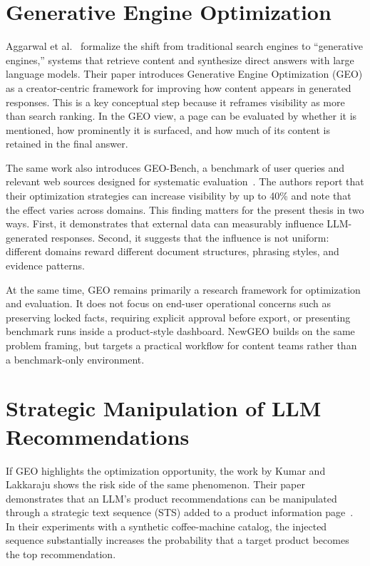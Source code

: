 \section{Generative Engine Optimization}

Aggarwal et al.~\cite{aggarwal2024geo} formalize the shift from traditional search engines to
``generative engines,'' systems that retrieve content and synthesize direct answers with large
language models. Their paper introduces Generative Engine Optimization (GEO) as a
creator-centric framework for improving how content appears in generated responses. This is a
key conceptual step because it reframes visibility as more than search ranking. In the GEO
view, a page can be evaluated by whether it is mentioned, how prominently it is surfaced, and
how much of its content is retained in the final answer.

The same work also introduces GEO-Bench, a benchmark of user queries and relevant web
sources designed for systematic evaluation~\cite{aggarwal2024geo}. The authors report that
their optimization strategies can increase visibility by up to 40\% and note that the effect varies
across domains. This finding matters for the present thesis in two ways. First, it demonstrates
that external data can measurably influence LLM-generated responses. Second, it suggests that
the influence is not uniform: different domains reward different document structures, phrasing
styles, and evidence patterns.

At the same time, GEO remains primarily a research framework for optimization and
evaluation. It does not focus on end-user operational concerns such as preserving locked facts,
requiring explicit approval before export, or presenting benchmark runs inside a product-style
dashboard. NewGEO builds on the same problem framing, but targets a practical workflow for
content teams rather than a benchmark-only environment.

\section{Strategic Manipulation of LLM Recommendations}

If GEO highlights the optimization opportunity, the work by Kumar and Lakkaraju
shows the risk side of the same phenomenon. Their paper demonstrates that an LLM's product
recommendations can be manipulated through a strategic text sequence (STS) added to a
product information page~\cite{kumar2024manipulating}. In their experiments with a
synthetic coffee-machine catalog, the injected sequence substantially increases the probability
that a target product becomes the top recommendation.

